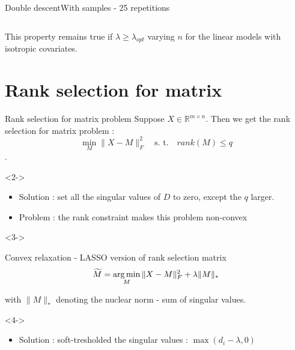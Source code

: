 \documentclass[10pt,aspectratio=43]{beamer}
\begin{document}
\begin{frame}{Double descent}{With samples \citep{nakkiran2020optimal} - 25 repetitions}
\begin{columns}
\begin{column}{0.7\textwidth}
\begin{center}
             \end{center}
        \end{column}
        \end{columns}
        \begin{block}{}
        This property remains true if $\lambda \geq \lambda_{opt}$ varying $n$ for the linear models with isotropic covariates.
        \end{block}
\end{frame}

\section{Rank selection for matrix}
\begin{frame}{Rank selection for matrix problem}{}
    Suppose $X \in \mathbb{R}^{m\times n }$. Then we get the rank selection for matrix problem :
    $$\min_{M} \|X-M\|_F^2 \quad \text{s. t.} \quad  rank(M) \leq q$$.
    \begin{onlyenv}<2->
    \begin{itemize}
        \item Solution : set all the singular values of $D$ to zero, except the $q$ larger.
        \item Problem : the rank constraint makes this problem non-convex
    \end{itemize}
    \end{onlyenv}
    \begin{onlyenv}<3->
        \begin{block}{Convex relaxation - LASSO version of rank selection matrix}
            $$\widetilde{M} = \mathop{\mathrm{arg\,min}}_{M} \|X-M\|_F^2 + \lambda \|M\|_*$$
            \begin{center}
                with $\|M\|_*$ denoting the nuclear norm - sum of singular values.
            \end{center}
        \end{block}
    \end{onlyenv}
    \begin{onlyenv}<4->
        \begin{itemize}
            \item Solution : soft-tresholded the singular values : $\max(d_i  -\lambda, 0)$
        \end{itemize}
        \end{onlyenv}
\end{frame}
\end{document}
